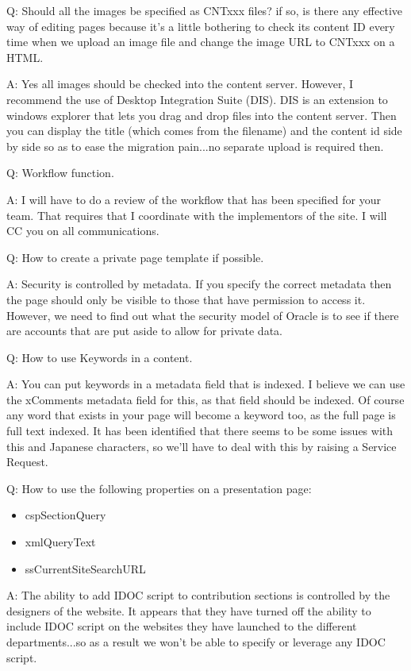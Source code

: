 \clearpage

Q: Should all the images be specified as CNTxxx files? if so, is there
any effective way of editing pages because it's a little bothering to
check its content ID every time when we upload an image file and
change the image URL to CNTxxx on a HTML.

A: Yes all images should be checked into the content server.  However,
I recommend the use of Desktop Integration Suite (DIS).  DIS is an
extension to windows explorer that lets you drag and drop files into
the content server.  Then you can display the title (which comes from
the filename) and the content id side by side so as to ease the
migration pain...no separate upload is required then.

Q: Workflow function.

A: I will have to do a review of the workflow that has been specified
for your team.  That requires that I coordinate with the implementors
of the site.  I will CC you on all communications.

Q: How to create a private page template if possible.

A: Security is controlled by metadata.  If you specify the correct
metadata then the page should only be visible to those that have
permission to access it.  However, we need to find out what the
security model of Oracle is to see if there are accounts that are put
aside to allow for private data.

Q: How to use Keywords in a content.

A: You can put keywords in a metadata field that is indexed.  I
believe we can use the xComments metadata field for this, as that
field should be indexed.  Of course any word that exists in your page
will become a keyword too, as the full page is full text indexed.  It
has been identified that there seems to be some issues with this and
Japanese characters, so we'll have to deal with this by raising a
Service Request.


Q: How to use the following properties on a presentation page: 
\begin{itemize}
\item cspSectionQuery
\item xmlQueryText
\item ssCurrentSiteSearchURL
\end{itemize}

A: The ability to add IDOC script to contribution sections is
controlled by the designers of the website.  It appears that they have
turned off the ability to include IDOC script on the websites they
have launched to the different departments...so as a result we won't
be able to specify or leverage any IDOC script.